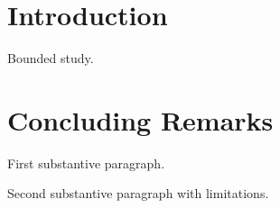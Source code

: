 \documentclass{article}
\begin{document}
\section{Introduction}
Bounded study.
\section{Concluding Remarks}
First substantive paragraph.

Second substantive paragraph with limitations.
\end{document}
